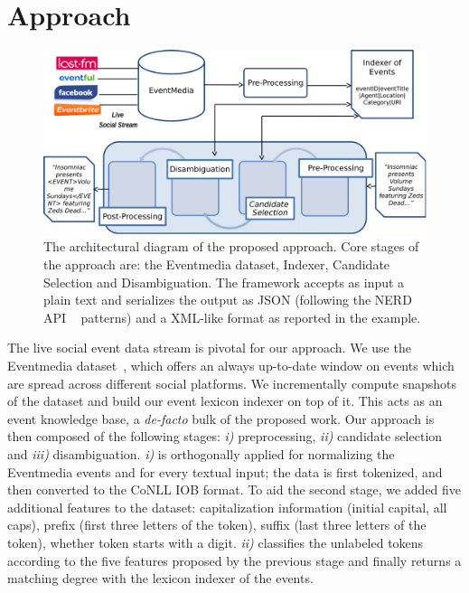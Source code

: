 \documentclass[10pt,a4paper]{article}
\begin{document}
\section{Approach}
\begin{figure}
\includegraphics[width=\textwidth]{architecture.pdf}
\caption{The architectural diagram of the proposed approach. Core stages of the approach are: the Eventmedia dataset, Indexer, Candidate Selection and Disambiguation. The framework accepts as input a plain text and serializes the output as JSON (following the NERD API ~\cite{RIZZO:2012} patterns) and a XML-like format as reported in the example.}
\label{fig:architecture}
\end{figure}
The live social event data stream is pivotal for our approach. We use the Eventmedia dataset~\cite{krouf2012}, which offers an always up-to-date window on events which are spread across different social platforms. We incrementally compute snapshots of the dataset and build our event lexicon indexer on top of it. This acts as an event knowledge base, a \textit{de-facto} bulk of the proposed work. Our approach is then composed of the following stages: \textit{i)} preprocessing, \textit{ii)} candidate selection and \textit{iii)} disambiguation. \textit{i)} is orthogonally applied for normalizing the Eventmedia events and for every textual input; the data is first tokenized, and then converted to the CoNLL IOB format. To aid the second stage, we added five additional features to the dataset: capitalization information (initial capital, all caps), prefix (first three letters of the token), suffix (last three letters of the token), whether token starts with a digit.
\textit{ii)} classifies the unlabeled tokens according to the five features proposed by the previous stage and finally returns a matching degree with the lexicon indexer of the events. 
\end{document}
